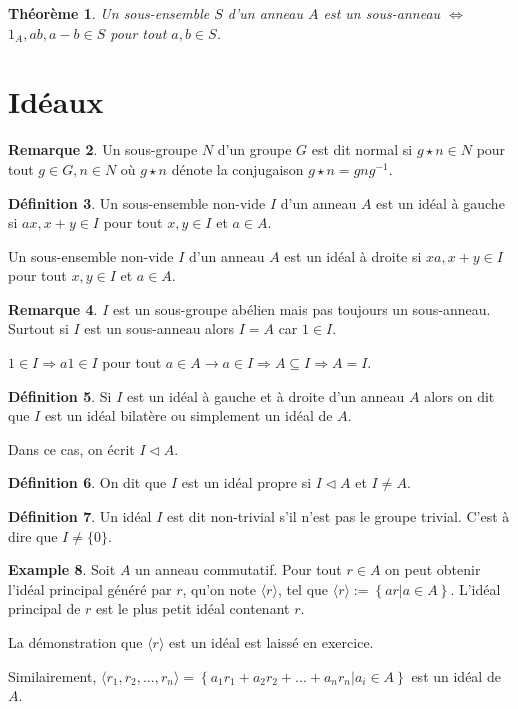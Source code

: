 \documentclass{book}
\newcommand{\ideal}{\vartriangleleft}
\theoremstyle{plain}
\newtheorem{thm}{Théorème}[chapter] %
\theoremstyle{definition}
\newtheorem{defn}[thm]{Définition} %
\newtheorem{ex}[thm]{Example} %
\newtheorem{rmrk}[thm]{Remarque}
\begin{document}
\begin{thm}
Un sous-ensemble $S$ d'un anneau $A$ est un sous-anneau $\iff$ $1_A,ab, a-b\in S$ pour tout $a,b\in S$.
\end{thm}

\section{Idéaux}
\label{sec:ideal}
\begin{rmrk}
Un sous-groupe $N$ d'un groupe $G$ est dit normal si $g\star n\in N$ pour tout $g\in G,n\in N$ où $g\star n$ dénote la  conjugaison $g\star n=gng^{-1}$.
\end{rmrk}

\begin{defn}
Un sous-ensemble non-vide $I$  d'un anneau $A$ est un idéal à gauche si $ax,x+y\in I$ pour tout $x,y\in I$ et $a\in A$.

Un sous-ensemble non-vide $I$  d'un anneau $A$ est un idéal à droite si $xa,x+y\in I$ pour tout $x,y\in I$ et $a\in A$.
\end{defn}

\begin{rmrk}
$I$ est un sous-groupe abélien mais pas toujours un sous-anneau. Surtout si $I$ est un sous-anneau alors $I=A$ car $1\in I$.

$1\in I\Longrightarrow a1\in I$ pour tout $a\in A\longrightarrow a\in I \Longrightarrow A\subseteq I\Longrightarrow A=I$.
\end{rmrk}

\begin{defn}
Si $I$ est un idéal à gauche et à droite d'un anneau $A$ alors on dit que $I$ est un idéal bilatère ou simplement un idéal de $A$.

Dans ce cas, on écrit $I\ideal A$.
\end{defn}

\begin{defn}
On dit que $I$ est un idéal propre si $I\ideal A$ et $I\neq A$.
\end{defn}

\begin{defn}
Un idéal $I$ est dit non-trivial s'il n'est  pas le groupe trivial. C'est à dire que $I\neq\{0\}$.
\end{defn}

\begin{ex}
Soit $A$ un anneau commutatif. Pour tout $r\in A$ on peut obtenir l'idéal principal généré par $r$, qu'on note $\langle r\rangle$, tel que $\langle r\rangle:=\left\{ ar | a\in A\right\}$. L'idéal principal de $r$ est le plus petit idéal contenant $r$.

La démonstration que $\langle r\rangle$ est un idéal est laissé en exercice.

Similairement, $\langle r_1,r_2,...,r_n\rangle=\left\{ a_1r_1+a_2r_2+...+a_nr_n | a_i\in A\right\}$ est un idéal de $A$.
\end{ex}
\end{document}
